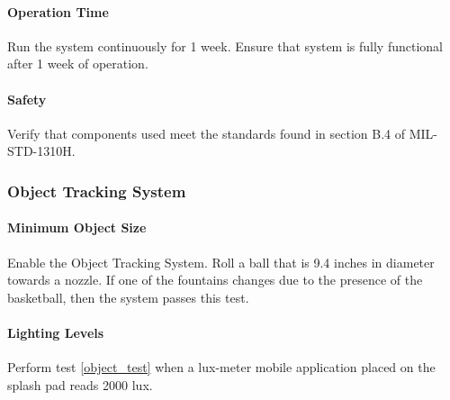 \paragraph{Operation Time}
Run the system continuously for 1 week. Ensure that system is fully functional after 1 week of operation. 

\paragraph{Safety}

Verify that components used meet the standards found in section B.4 of MIL-STD-1310H.




\subsubsection{Object Tracking System}

\paragraph{\label{object_test}Minimum Object Size}
Enable the Object Tracking System. Roll a ball that is 9.4 inches in diameter towards a nozzle. If one of the fountains changes due to the presence of the basketball, then the system passes this test. 

\paragraph{Lighting Levels}
Perform test \ref{object_test} when a lux-meter mobile application placed on the splash pad reads 2000 lux. 

